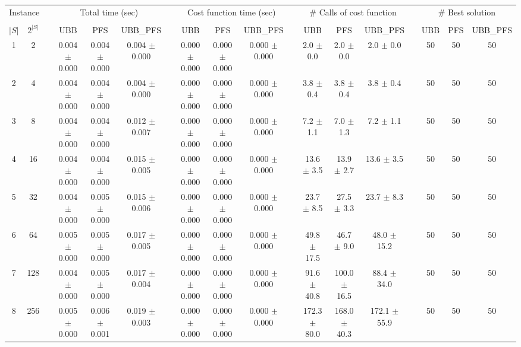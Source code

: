 \documentclass[11pt]{article}
\begin{document}
\begin{landscape}
\begin{table}
\centering
\footnotesize
\begin{tabular}{cccccccccccccccccc}
\toprule
\multicolumn{2}{c}{Instance} & \phantom{} & \multicolumn{3}{c}{Total time (sec)}  & \phantom{} & \multicolumn{3}{c}{Cost function time (sec)}  & \phantom{} & \multicolumn{3}{c}{\# Calls of cost function}  & \phantom{} & \multicolumn{3}{c}{\# Best solution}\\
\cline{1-2}\cline{4-6}\cline{8-10}\cline{12-14}\cline{16-18}\\
$|S|$ & $2^{|S|}$ && UBB & PFS & UBB_PFS && UBB & PFS & UBB_PFS && UBB & PFS & UBB_PFS && UBB & PFS & UBB_PFS \\
 1 &       2 &&  0.004 $\pm$ 0.000 & 0.004 $\pm$ 0.000 & 0.004 $\pm$ 0.000 &&  0.000 $\pm$ 0.000 & 0.000 $\pm$ 0.000 & 0.000 $\pm$ 0.000 &&   2.0 $\pm$  0.0 &  2.0 $\pm$  0.0 &  2.0 $\pm$  0.0 && 50& 50& 50\\
 2 &       4 &&  0.004 $\pm$ 0.000 & 0.004 $\pm$ 0.000 & 0.004 $\pm$ 0.000 &&  0.000 $\pm$ 0.000 & 0.000 $\pm$ 0.000 & 0.000 $\pm$ 0.000 &&   3.8 $\pm$  0.4 &  3.8 $\pm$  0.4 &  3.8 $\pm$  0.4 && 50& 50& 50\\
 3 &       8 &&  0.004 $\pm$ 0.000 & 0.004 $\pm$ 0.000 & 0.012 $\pm$ 0.007 &&  0.000 $\pm$ 0.000 & 0.000 $\pm$ 0.000 & 0.000 $\pm$ 0.000 &&   7.2 $\pm$  1.1 &  7.0 $\pm$  1.3 &  7.2 $\pm$  1.1 && 50& 50& 50\\
 4 &      16 &&  0.004 $\pm$ 0.000 & 0.004 $\pm$ 0.000 & 0.015 $\pm$ 0.005 &&  0.000 $\pm$ 0.000 & 0.000 $\pm$ 0.000 & 0.000 $\pm$ 0.000 &&  13.6 $\pm$  3.5 & 13.9 $\pm$  2.7 & 13.6 $\pm$  3.5 && 50& 50& 50\\
 5 &      32 &&  0.004 $\pm$ 0.000 & 0.005 $\pm$ 0.000 & 0.015 $\pm$ 0.006 &&  0.000 $\pm$ 0.000 & 0.000 $\pm$ 0.000 & 0.000 $\pm$ 0.000 &&  23.7 $\pm$  8.5 & 27.5 $\pm$  3.3 & 23.7 $\pm$  8.3 && 50& 50& 50\\
 6 &      64 &&  0.005 $\pm$ 0.000 & 0.005 $\pm$ 0.000 & 0.017 $\pm$ 0.005 &&  0.000 $\pm$ 0.000 & 0.000 $\pm$ 0.000 & 0.000 $\pm$ 0.000 &&  49.8 $\pm$ 17.5 & 46.7 $\pm$  9.0 & 48.0 $\pm$ 15.2 && 50& 50& 50\\
 7 &     128 &&  0.004 $\pm$ 0.000 & 0.005 $\pm$ 0.000 & 0.017 $\pm$ 0.004 &&  0.000 $\pm$ 0.000 & 0.000 $\pm$ 0.000 & 0.000 $\pm$ 0.000 &&  91.6 $\pm$ 40.8 & 100.0 $\pm$ 16.5 & 88.4 $\pm$ 34.0 && 50& 50& 50\\
 8 &     256 &&  0.005 $\pm$ 0.000 & 0.006 $\pm$ 0.001 & 0.019 $\pm$ 0.003 &&  0.000 $\pm$ 0.000 & 0.000 $\pm$ 0.000 & 0.000 $\pm$ 0.000 &&  172.3 $\pm$ 80.0 & 168.0 $\pm$ 40.3 & 172.1 $\pm$ 55.9 && 50& 50& 50\\

\end{tabular}
\end{table}
\end{landscape}
\end{document}
